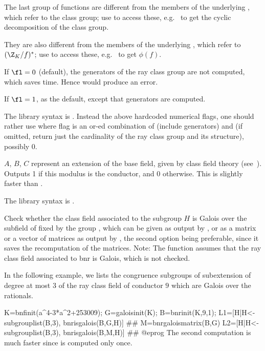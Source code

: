 The last group of functions are different from the members of the underlying
, which refer to the class group; use 
to access these, e.g.~ to get the cyclic decomposition
of the class group.

They are also different from the members of the underlying , which
refer to $(\Z_K/f)^*$; use  to access these,
e.g.~ to get $\phi(f)$.

If $\fl=0$ (default), the generators of the ray class group are not computed,
which saves time. Hence  would produce an error.

If $\fl=1$, as the default, except that generators are computed.

The library syntax is .
Instead the above  hardcoded  numerical flags,  one should rather use
where flag is an or-ed combination of  (include generators)
and  (if omitted, return just the cardinality of the ray class
group and its structure), possibly 0.

\label{se:bnrisconductor}
$A$, $B$, $C$ represent
an extension of the base field, given by class field theory
(see~). Outputs 1 if this modulus is the conductor, and 0
otherwise. This is slightly faster than .

The library syntax is .

\label{se:bnrisgalois}
Check whether the class field associated to the subgroup $H$ is Galois
over the subfield of  fixed by the group , which can be
given as output by , or as a matrix or a vector of matrices as
output by , the second option being preferable, since it
saves the recomputation of the matrices.  Note: The function assumes that the
ray class field associated to bnr is Galois, which is not checked.

In the following example, we lists the congruence subgroups of subextension of
degree at most $3$ of the ray class field of conductor $9$ which are Galois
over the rationals.

\bprog
K=bnfinit(a^4-3*a^2+253009);
G=galoisinit(K);
B=bnrinit(K,9,1);
L1=[H|H<-subgrouplist(B,3), bnrisgalois(B,G,H)]
##
M=bnrgaloismatrix(B,G)
L2=[H|H<-subgrouplist(B,3), bnrisgalois(B,M,H)]
##
@eprog
The second computation is much faster since  is
computed only once.

